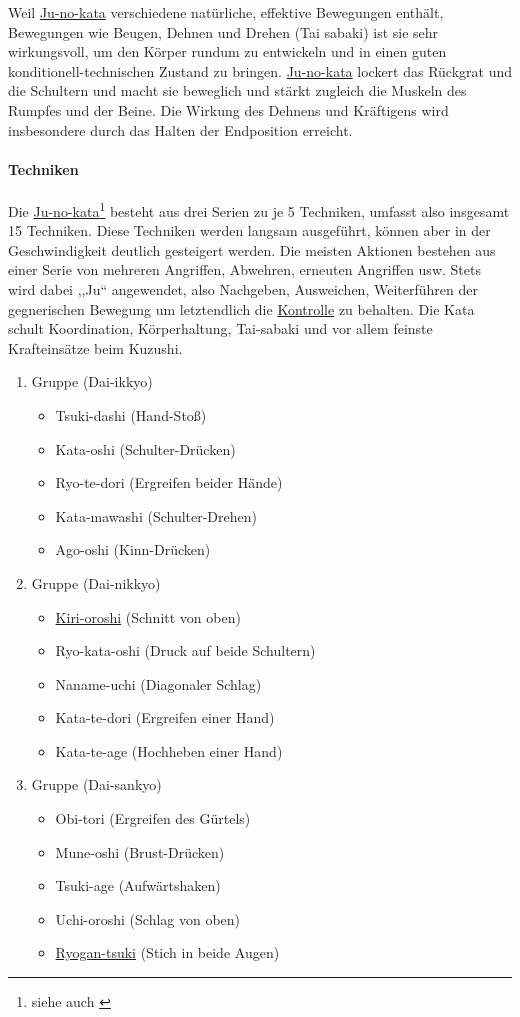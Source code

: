 \documentclass[justified, a4paper, notitlepage, captions=tableheading, nobib]{tufte-handout}
\begin{document}
Weil \hyperref[orgd6be93b]{Ju-no-kata} verschiedene natürliche, effektive Bewegungen enthält, Bewegungen wie Beugen, Dehnen und Drehen (Tai sabaki) ist sie sehr wirkungsvoll, um den Körper rundum zu entwickeln und in einen guten konditionell-technischen Zustand zu bringen. \hyperref[orgd6be93b]{Ju-no-kata} lockert das Rückgrat und die Schultern und macht sie beweglich und stärkt zugleich die Muskeln des Rumpfes und der Beine. Die Wirkung des Dehnens und Kräftigens wird insbesondere durch das Halten der Endposition erreicht.


\paragraph{Techniken}
\label{sec:org12d72ea}
Die \hyperref[orgd6be93b]{Ju-no-kata}\footnote{\raggedright siehe auch \citep{kano2007kodokan, djbkataregelwerk}} besteht aus drei Serien zu je 5 Techniken, umfasst also insgesamt 15 Techniken. 
Diese Techniken werden langsam ausgeführt, können aber in der Geschwindigkeit deutlich gesteigert werden. 
Die meisten Aktionen bestehen aus einer Serie von mehreren Angriffen, Abwehren, erneuten Angriffen usw. 
Stets wird dabei ,,Ju`` angewendet, also Nachgeben, Ausweichen, Weiterführen der gegnerischen Bewegung um letztendlich die \hyperref[org15bbf8e]{Kontrolle} zu behalten. 
Die Kata schult Koordination, Körperhaltung, Tai-sabaki und vor allem feinste Krafteinsätze beim Kuzushi.

\begin{enumerate}
\item Gruppe (Dai-ikkyo)
\begin{itemize}
\item Tsuki-dashi (Hand-Stoß)
\item Kata-oshi (Schulter-Drücken)
\item Ryo-te-dori (Ergreifen beider Hände)
\item Kata-mawashi (Schulter-Drehen)
\item Ago-oshi (Kinn-Drücken)
\end{itemize}
\item Gruppe (Dai-nikkyo)
\begin{itemize}
\item \hyperref[org16eadd0]{Kiri-oroshi} (Schnitt von oben)
\item Ryo-kata-oshi (Druck auf beide Schultern)
\item Naname-uchi (Diagonaler Schlag)
\item Kata-te-dori (Ergreifen einer Hand)
\item Kata-te-age (Hochheben einer Hand)
\end{itemize}
\item Gruppe (Dai-sankyo)
\begin{itemize}
\item Obi-tori (Ergreifen des Gürtels)
\item Mune-oshi (Brust-Drücken)
\item Tsuki-age (Aufwärtshaken)
\item Uchi-oroshi (Schlag von oben)
\item \hyperref[org1d2064b]{Ryogan-tsuki} (Stich in beide Augen)
\end{itemize}
\end{enumerate}
\end{document}
